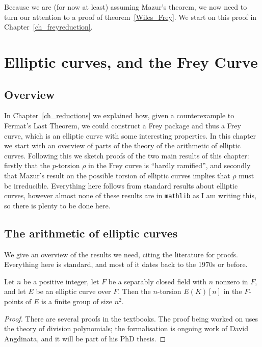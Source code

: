 Because we are (for now at least) assuming Mazur's theorem, we now need to turn our attention
to a proof of theorem~\ref{Wiles_Frey}. We start on this proof in Chapter~\ref{ch_freyreduction}.


\chapter{Elliptic curves, and the Frey Curve}\label{ch_frey}

\section{Overview}

In Chapter~\ref{ch_reductions} we explained how, given a counterexample to Fermat's Last Theorem, we could construct a Frey package and thus a Frey curve, which is an elliptic curve with some interesting properties. In this chapter we start with an overview of parts of the theory of the arithmetic of elliptic curves. Following
this we sketch proofs of the two main results of this chapter: firstly that the $p$-torsion $\rho$ in the Frey curve is ``hardly ramified'', and secondly that Mazur's result on the possible torsion of elliptic curves implies that $\rho$ must be irreducible. Everything here follows from standard results about elliptic curves, however almost none of these results are in {\tt mathlib} as I am writing this, so there is plenty to be done here.

\section{The arithmetic of elliptic curves}

We give an overview of the results we need, citing the literature for proofs. Everything here is
 standard, and most of it dates back to the 1970s or before.

\begin{theorem}\label{WeierstrassCurve.n_torsion_card}\notready
  Let $n$ be a positive integer, let $F$ be a separably closed
  field with $n$ nonzero in $F$, and let $E$ be an elliptic curve over $F$. Then the $n$-torsion $E(K)[n]$
  in the $F$-points of $E$ is a finite group of size $n^2$.
\end{theorem}
\begin{proof}
  There are several proofs in the textbooks. The proof being worked on uses the theory of division polynomials; the formalisation is ongoing work of David Angdinata, and it will be part of his PhD thesis.
\end{proof}

